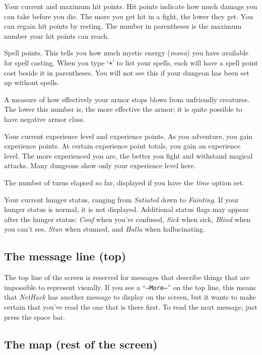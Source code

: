 Your current and maximum hit points.  Hit points indicate how much
damage you can take before you die.  The more you get hit in a fight,
the lower they get.  You can regain hit points by resting.  The number
in parentheses is the maximum number your hit points can reach.
\item[\bb{Power}]
Spell points.  This tells you how much mystic energy ({\it mana\/})
you have available for spell casting.  When you type `{\tt +}' to
list your spells, each will have a spell point cost beside
it in parentheses.  You will not see this if your dungeon
has been set up without spells.
\item[\bb{Armor Class}]
A measure of how effectively your armor stops blows from unfriendly
creatures.  The lower this number is, the more effective the armor; it
is quite possible to have negative armor class.
\item[\bb{Experience}]
Your current experience level and experience points.  As you
adventure, you gain experience points.  At certain experience point
totals, you gain an experience level.  The more experienced you are,
the better you fight and withstand magical attacks.  Many dungeons
show only your experience level here.
\item[\bb{Time}]
The number of turns elapsed so far, displayed if you have the
{\it time\/} option set.
\item[\bb{Hunger Status}]
Your current hunger status, ranging from %
{\it Satiated\/} down to {\it Fainting}.  If your hunger status is normal,
it is not displayed.
Additional status flags may appear after the hunger status:
{\it Conf\/} when you're confused, {\it Sick\/} when sick, {\it Blind\/}
when you can't see, {\it Stun\/} when stunned, and {\it Hallu\/} when
hallucinating.
\elist

\subsection*{The message line (top)}

The top line of the screen is reserved for messages that describe
things that are impossible to represent visually.  If you see a
``{\tt --More--}'' on the top line, this means that {\it NetHack\/} has
another message to display on the screen, but it wants to make certain
that you've read the one that is there first.  To read the next message,
just press the space bar.

\subsection*{The map (rest of the screen)}

